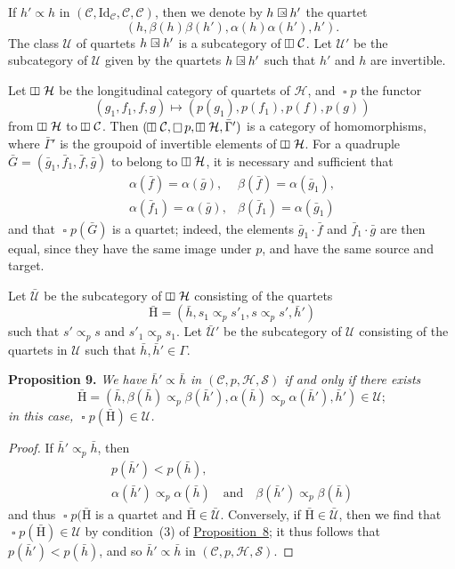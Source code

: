 \documentclass[a4paper,oneside,nobib,nofonts,notitlepage,notoc,nols,fleqn,justified]{tufte-book}
\newenvironment{itenv}[1]
  {\phantomsection\par\medskip\noindent\textbf{#1.}\itshape}
  {\par\medskip}
\newcommand{\oldpage}[1]{{\reversemarginpar\marginnote{\raggedleft\footnotesize\textit{p.~#1}}}}
\newcommand{\CC}{\mathcal{C}}
\newcommand{\HH}{\mathcal{H}}
\newcommand{\rHH}{\mathrm{H}}
\renewcommand{\SS}{\mathcal{S}}
\newcommand{\UU}{\mathcal{U}}
\newcommand{\subs}{\mathrel{\propto}}
\newcommand{\Id}{\mathrm{Id}}
\DeclareMathOperator{\sq}{\square}
\DeclareMathOperator{\vsq}{\raisebox{-.1em}{\rotatebox{90}{$\boxminus$}\,}}
\newcommand{\sqsubs}{\mathrel{\mathrlap{\square}\raisebox{.17em}{\scaleobj{0.65}{\,\,\propto}}}}
\begin{document}
If $h'\subs h$ in $(\CC,\Id_\CC,\CC,\CC)$, then we denote by $h\sqsubs h'$ the quartet
\[
  (h,\beta(h)\beta(h'),\alpha(h)\alpha(h'),h').
\]
The class $\UU$ of quartets $h\sqsubs h'$ is a subcategory of $\vsq\CC$.
Let $\UU'$ be the subcategory of $\UU$ given by the quartets $h\sqsubs h'$ such that $h'$ and $h$ are invertible.

Let $\vsq\HH$ be the longitudinal category of quartets of $\HH$, and $\sq p$ the functor
\[
  (g_1,f_1,f,g)
  \longmapsto (p(g_1),p(f_1),p(f),p(g))
\]
from $\vsq\HH$ to $\vsq\CC$.
Then $(\vsq\CC,\sq p,\vsq\HH,\bar{\Gamma}')$ is a category of homomorphisms, where $\bar{\Gamma}'$ is the groupoid of invertible elements of $\vsq\HH$.
For a quadruple $\bar{G}=(\bar{g}_1,\bar{f}_1,\bar{f},\bar{g})$ to belong to $\vsq\HH$, it is necessary and sufficient that
\[
  \begin{array}{ll}
    \alpha(\bar{f})=\alpha(\bar{g}),
    & \beta(\bar{f})=\alpha(\bar{g}_1),
  \\\alpha(\bar{f}_1)=\alpha(\bar{g}),
    & \beta(\bar{f}_1)=\alpha(\bar{g}_1)
  \end{array}
\]
and that $\sq p(\bar{G})$ is a quartet;
indeed, the elements $\bar{g}_1\cdot\bar{f}$ and $\bar{f}_1\cdot\bar{g}$ are then equal, since they have the same image under $p$, and have the same source and target.

\oldpage{366}
Let $\bar{\UU}$ be the subcategory of $\vsq\HH$ consisting of the quartets
\[
  \bar{\rHH}
  = (\bar{h}, s_1\subs_p s'_1, s\subs_p s', \bar{h}')
\]
such that $s'\subs_p s$ and $s'_1\subs_p s_1$.
Let $\bar{\UU}'$ be the subcategory of $\UU$ consisting of the quartets in $\UU$ such that $\bar{h},\bar{h}'\in\Gamma$.

\begin{itenv}{Proposition 9}
\label{proposition:9}
  We have $\bar{h}'\subs\bar{h}$ in $(\CC,p,\HH,\SS)$ if and only if there exists
  \[
    \bar{\rHH}
    = \left(
      \bar{h},
      \beta(\bar{h})\subs_p\beta(\bar{h}'),
      \alpha(\bar{h})\subs_p\alpha(\bar{h}'),
      \bar{h}'
    \right) \in \UU;
  \]
  in this case, $\sq p(\bar{\rHH})\in\UU$.
\end{itenv}

\begin{proof}
  If $\bar{h}'\subs_p\bar{h}$, then
  \[
    \begin{gathered}
      p(\bar{h}')<p(\bar{h}),
    \\\alpha(\bar{h}')\subs_p\alpha(\bar{h})
      \quad\text{and}\quad
      \beta(\bar{h}')\subs_p\beta(\bar{h})
    \end{gathered}
  \]
  and thus $\sq p(\bar{\rHH}$ is a quartet and $\bar{\rHH}\in\bar{\UU}$.
  Conversely, if $\bar{\rHH}\in\bar{\UU}$, then we find that $\sq p(\bar{\rHH})\in\UU$ by condition~(3) of \hyperref[proposition:8]{Proposition~8};
  it thus follows that $p(\bar{h}')<p(\bar{h})$, and so $\bar{h}'\subs\bar{h}$ in $(\CC,p,\HH,\SS)$.
\end{proof}
\end{document}
